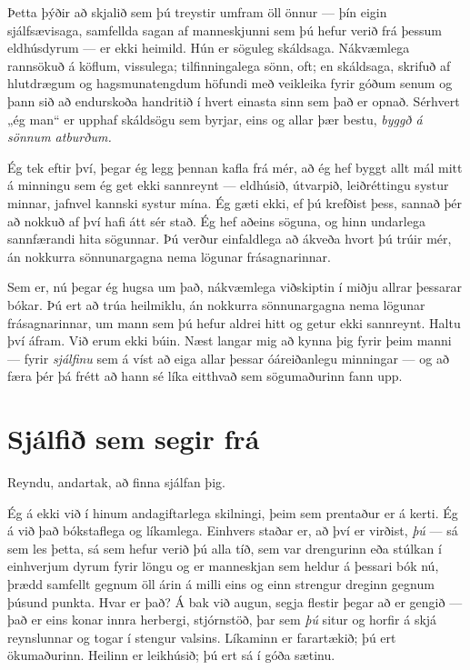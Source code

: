 Þetta þýðir að skjalið sem þú treystir umfram öll önnur — þín eigin sjálfsævisaga, samfellda sagan af manneskjunni sem þú hefur verið frá þessum eldhúsdyrum — er ekki heimild. Hún er söguleg skáldsaga. Nákvæmlega rannsökuð á köflum, vissulega; tilfinningalega sönn, oft; en skáldsaga, skrifuð af hlutdrægum og hagsmunatengdum höfundi með veikleika fyrir góðum senum og þann sið að endurskoða handritið í hvert einasta sinn sem það er opnað. Sérhvert „ég man“ er upphaf skáldsögu sem byrjar, eins og allar þær bestu, \emph{byggð á sönnum atburðum.}

Ég tek eftir því, þegar ég legg þennan kafla frá mér, að ég hef byggt allt mál mitt á minningu sem ég get ekki sannreynt — eldhúsið, útvarpið, leiðréttingu systur minnar, jafnvel kannski systur mína. Ég gæti ekki, ef þú krefðist þess, sannað þér að nokkuð af því hafi átt sér stað. Ég hef aðeins söguna, og hinn undarlega sannfærandi hita sögunnar. Þú verður einfaldlega að ákveða hvort þú trúir mér, án nokkurra sönnunargagna nema lögunar frásagnarinnar.

Sem er, nú þegar ég hugsa um það, nákvæmlega viðskiptin í miðju allrar þessarar bókar. Þú ert að trúa heilmiklu, án nokkurra sönnunargagna nema lögunar frásagnarinnar, um mann sem þú hefur aldrei hitt og getur ekki sannreynt. Haltu því áfram. Við erum ekki búin. Næst langar mig að kynna þig fyrir þeim manni — fyrir \emph{sjálfinu} sem á víst að eiga allar þessar óáreiðanlegu minningar — og að færa þér þá frétt að hann sé líka eitthvað sem sögumaðurinn fann upp.

\chapter{Sjálfið sem segir frá}

Reyndu, andartak, að finna sjálfan þig.

Ég á ekki við í hinum andagiftarlega skilningi, þeim sem prentaður er á kerti. Ég á við það bókstaflega og líkamlega. Einhvers staðar er, að því er virðist, \emph{þú} — sá sem les þetta, sá sem hefur verið þú alla tíð, sem var drengurinn eða stúlkan í einhverjum dyrum fyrir löngu og er manneskjan sem heldur á þessari bók nú, þrædd samfellt gegnum öll árin á milli eins og einn strengur dreginn gegnum þúsund punkta. Hvar er það? Á bak við augun, segja flestir þegar að er gengið — það er eins konar innra herbergi, stjórnstöð, þar sem \emph{þú} situr og horfir á skjá reynslunnar og togar í stengur valsins. Líkaminn er farartækið; þú ert ökumaðurinn. Heilinn er leikhúsið; þú ert sá í góða sætinu.

